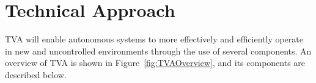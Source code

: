 \vspace{-2mm}\section{Technical Approach}\vspace{-2mm}



TVA will enable autonomous systems to more effectively and efficiently operate in new and uncontrolled environments through the use of several components. An overview of TVA is shown in Figure~\ref{fig:TVAOverview}, and its components are described below.






